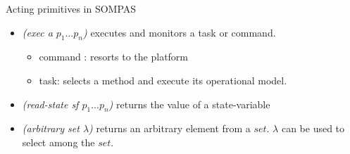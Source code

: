     
    
    

\begin{frame}{Acting primitives in SOMPAS}
    \begin{itemize}
    \pause
        \item \textit{(exec a $p_1...p_n$)} executes and monitors a task or command.
    \pause
        \begin{itemize}
            \item command : resorts to the platform
            \item task: selects a method and execute its operational model.
        \end{itemize}
    \pause
        \item \textit{(read-state sf $p_1...p_n$)} returns the value of a state-variable
        \item \textit{(arbitrary set $\lambda$)} returns an arbitrary element from a $set$. $\lambda$ can be used to select among the $set$.
    \end{itemize}
\end{frame}

